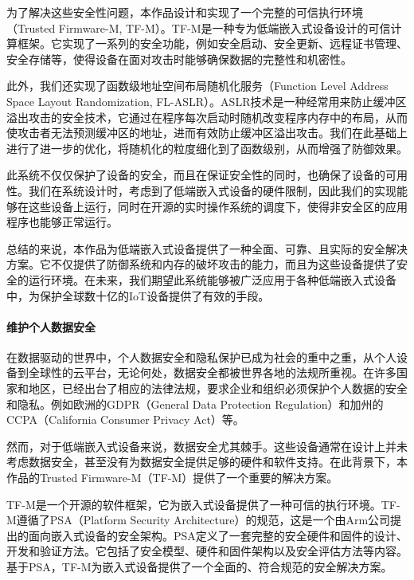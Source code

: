 \documentclass[UTF8,12pt,a4paper]{ctexart}
\numberwithin{figure}{section}
\begin{document}
\par 为了解决这些安全性问题，本作品设计和实现了一个完整的可信执行环境（Trusted Firmware-M, TF-M）。TF-M是一种专为低端嵌入式设备设计的可信计算框架。它实现了一系列的安全功能，例如安全启动、安全更新、远程证书管理、安全存储等，使得设备在面对攻击时能够确保数据的完整性和机密性。

\par 此外，我们还实现了函数级地址空间布局随机化服务（Function Level Address Space Layout Randomization, FL-ASLR）。ASLR技术是一种经常用来防止缓冲区溢出攻击的安全技术，它通过在程序每次启动时随机改变程序内存中的布局，从而使攻击者无法预测缓冲区的地址，进而有效防止缓冲区溢出攻击。我们在此基础上进行了进一步的优化，将随机化的粒度细化到了函数级别，从而增强了防御效果。

\par 此系统不仅仅保护了设备的安全，而且在保证安全性的同时，也确保了设备的可用性。我们在系统设计时，考虑到了低端嵌入式设备的硬件限制，因此我们的实现能够在这些设备上运行，同时在开源的实时操作系统的调度下，使得非安全区的应用程序也能够正常运行。

\par 总结的来说，本作品为低端嵌入式设备提供了一种全面、可靠、且实际的安全解决方案。它不仅提供了防御系统和内存的破坏攻击的能力，而且为这些设备提供了安全的运行环境。在未来，我们期望此系统能够被广泛应用于各种低端嵌入式设备中，为保护全球数十亿的IoT设备提供了有效的手段。
\paragraph{维护个人数据安全}
\par 在数据驱动的世界中，个人数据安全和隐私保护已成为社会的重中之重，从个人设备到全球性的云平台，无论何处，数据安全都被世界各地的法规所重视。在许多国家和地区，已经出台了相应的法律法规，要求企业和组织必须保护个人数据的安全和隐私。例如欧洲的GDPR（General Data Protection Regulation）和加州的CCPA（California Consumer Privacy Act）等。

\par 然而，对于低端嵌入式设备来说，数据安全尤其棘手。这些设备通常在设计上并未考虑数据安全，甚至没有为数据安全提供足够的硬件和软件支持。在此背景下，本作品的Trusted Firmware-M（TF-M）提供了一个重要的解决方案。

\par TF-M是一个开源的软件框架，它为嵌入式设备提供了一种可信的执行环境。TF-M遵循了PSA（Platform Security Architecture）的规范，这是一个由Arm公司提出的面向嵌入式设备的安全架构。PSA定义了一套完整的安全硬件和固件的设计、开发和验证方法。它包括了安全模型、硬件和固件架构以及安全评估方法等内容。基于PSA，TF-M为嵌入式设备提供了一个全面的、符合规范的安全解决方案。
\end{document}
